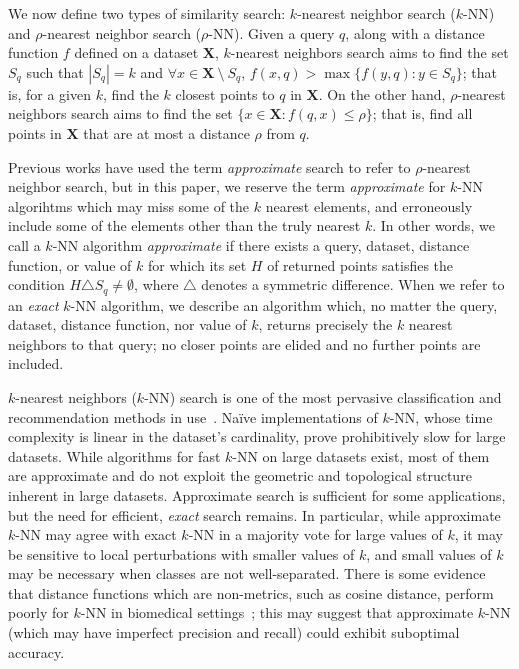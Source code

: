 {\color{red} We now define two types of similarity search: $k$-nearest neighbor search ($k$-NN) and $\rho$-nearest neighbor search ($\rho$-NN). 
Given a query $q$, along with a distance function $f$ defined on a dataset $\textbf{X}$, $k$-nearest neighbors search aims to find 
the set $S_q$ such that  $|S_q| = k$ and $\forall x \in \textbf{X} \ \setminus \ S_q$, $f(x, q) > \max\{f(y, q): y \in S_q \}$;
that is, for a given $k$, find the $k$ closest points to $q$ in $ \textbf{X}$.
On the other hand, $\rho$-nearest neighbors search aims to find the set $\{x \in \textbf{X}: f(q, x) \leq \rho \}$;
that is, find all points in $\textbf{X}$ that are at most a distance $\rho$ from $q$.}




{\color{red} 
Previous works have used the term \emph{approximate} search to refer to $\rho$-nearest neighbor search, but in this paper, 
we reserve the term \emph{approximate} for $k$-NN algorihtms which may miss some of the $k$ nearest elements, and erroneously include some of the elements other than the truly nearest $k$.
In other words, we call a $k$-NN algorithm \emph{approximate} if there exists a query, dataset, distance function, or value of $k$ for which its set $H$ of returned points satisfies the condition $H \triangle S_q \neq \emptyset$, where $\triangle$ denotes a symmetric difference.
When we refer to an \emph{exact} $k$-NN algorithm, we describe an algorithm which, no matter the query, dataset, distance function, nor value of $k$, returns precisely the $k$ nearest neighbors to that query;
no closer points are elided and no further points are included. }


$k$-nearest neighbors ($k$-NN) search is one of the most pervasive classification and recommendation methods in use~\cite{fix1952discriminatory, cover1967nearest}. 
Na\"{i}ve implementations of $k$-NN, whose time complexity is linear in the dataset's cardinality, prove prohibitively slow for large datasets.
While algorithms for fast $k$-NN on large datasets exist, most of them are approximate and do not exploit the geometric and topological structure inherent in large datasets.
Approximate search is sufficient for some applications, but the need for efficient, \emph{exact} search remains.
In particular, while approximate $k$-NN may agree with exact $k$-NN in a majority vote for large values of $k$, it may be sensitive to local perturbations with smaller values of $k$, and small values of $k$ may be necessary when classes are not well-separated.
There is some evidence that distance functions which are non-metrics, such as cosine distance, perform poorly for $k$-NN in biomedical settings~\cite{hu2016distance};
this may suggest that approximate $k$-NN (which may have imperfect precision and recall) could exhibit suboptimal accuracy.

